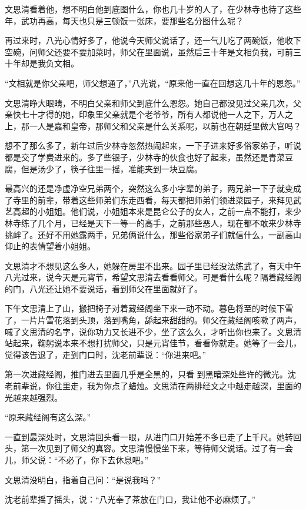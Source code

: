 文思清看着他，想不明白他到底图什么，你也几十岁的人了，在少林寺也待了这些年，武功再高，每天也只是三顿饭一张床，要那些名分图什么呢？

再过来时，八光心情好多了，他说今天师父说话了，还一气儿吃了两碗饭，他收下空碗，问师父还要不要加菜时，师父在里面说，虽然后三十年是文相负我，可前三十年却是我负文相。

“文相就是你父亲吧，师父想通了，”八光说，“原来他一直在回想这几十年的恩怨。”

文思清睁大眼睛，不明白父亲和师父到底什么恩怨。她自己都没见过父亲几次，父亲快七十才得的她，印象里父亲就是个老爷爷，所有人都说他一人之下，万人之上，那一人是嘉和皇帝，那师父和父亲是什么关系呢，以前也在朝廷里做大官吗？

想不了那么多了，新年过后少林寺忽然热闹起来，一下子进来好多俗家弟子，听说都是交了学费进来的。多了些银子，少林寺的伙食也好了起来，虽然还是青菜豆腐，但是汤少了，筷子往里一摇，准能夹到一块豆腐。

最高兴的还是净虚净空兄弟两个，突然这么多小字辈的弟子，两兄弟一下子就变成了寺里的前辈，带着这些师弟们东走西看，每天都把师弟们领进菜园子，来拜见武艺高超的小姐姐。他们说，小姐姐本来是昆仑公子的女人，之前一点不能打，来少林寺练了几个月，已经是天下一等一的高手，之前那些恶人，现在都不敢来少林寺挑衅了。还好不用她露两手，兄弟俩说什么，那些俗家弟子们就信什么，一副高山仰止的表情望着小姐姐。

文思清才不想见这么多人，她躲在房里不出来。园子里已经没法练武了，有天中午八光过来，说今天是元宵节，希望文思清去看看师父。可是看什么呢？隔着藏经阁的门，八光还让她不要说话，看到师父在里面就好了。

下午文思清上了山，搬把椅子对着藏经阁坐下来一动不动。暮色将至的时候下雪了，一片片雪花落到头顶，落到嘴角，舔起来甜甜的。师父在藏经阁咳嗽了两声，喊了文思清的名字，说你功力又长进不少，坐了这么久，才听出你也来了。文思清站起来，鞠躬说本来不想打扰师父，只是元宵佳节，看看你就走。她等了一会儿，觉得该告退了，走到门口时，沈老前辈说：“你进来吧。”

第一次进藏经阁，推门进去里面几乎是全黑的，只看
到黑暗深处些许的微光。沈老前辈说，你往里走，我为你点了蜡烛。文思清在两排经文之中越走越深，里面的光越来越强烈。

“原来藏经阁有这么深。”

一直到最深处时，文思清回头看一眼，从进门口开始差不多已走了上千尺。她转回头，第一次见到了师父的真容。文思清慢慢坐下来，等待师父说话。过了有一会儿，师父说：“不必了，你下去休息吧。”

文思清没明白，指着自己问：“是说我吗？”

沈老前辈摇了摇头，说：“八光奉了茶放在门口，我让他不必麻烦了。”

